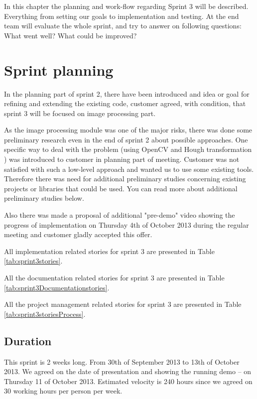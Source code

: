 In this chapter the planning and work-flow regarding Sprint 3 will be described. 
Everything from setting our goals to implementation and testing. At the end team will evaluate the whole sprint, and try to answer on following questions: What went well? What could be improved?  

\section{Sprint planning}
In the planning part of sprint 2, there have been introduced and idea or goal for refining and extending the existing code, customer agreed, with condition, that sprint 3 will be focused on image processing part.

As the image processing module was one of the major risks, there was done some preliminary research even in the end of sprint 2 about possible approaches.
One specific way to deal with the problem (using OpenCV and Hough transformation \cite{Duda:1972:UHT:361237.361242}) was introduced to customer in planning part of meeting.
Customer was not satisfied with such a low-level approach and wanted us to use some existing tools.
Therefore there was need for additional preliminary studies concerning existing projects or libraries that could be used.
You can read more about additional preliminary studies below.

Also there was made a proposal of additional "pre-demo" video showing the progress of implementation on Thursday 4th of October 2013 during the regular meeting and customer gladly accepted this offer.

All implementation related stories for sprint 3 are presented in Table \ref{tab:sprint3stories}.


All the documentation related stories for sprint 3 are presented in Table \ref{tab:sprint3Documentationstories}.

All the project management related stories for sprint 3 are presented in Table \ref{tab:sprint3storiesProcess}.


\subsection{Duration}
This sprint is 2 weeks long. From 30th of September 2013 to 13th of October 2013.
We agreed on the date of presentation and showing the running demo -- on Thursday 11 of October 2013.
Estimated velocity is 240 hours since we agreed on 30 working hours per person per week.

